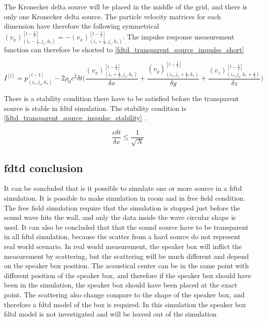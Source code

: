 The Kronecker delta source will be placed in the middle of the grid, and there is only one Kronecker delta source. The particle velocity matrices for each dimension have therefore the following symmetrical $(v_x)_{(i_{s}-\frac{1}{2},j_{s},k_{s})}^{[l-\frac{1}{2}]} = -(v_x)_{(i_{s}+\frac{1}{2},j_{s},k_{s})}^{[l-\frac{1}{2}]}$. The impulse response measurement function can therefore be shorted to \autoref{fdtd_transparent_source_impulse_short}

\begin{equation}\label{fdtd_transparent_source_impulse_short}
I^{[l]}=p_{(i_{s},j_{s},k_{s})}^{[l-1]} - 2\rho_0 c^2 \delta t  \Biggl( \frac{(v_x)_{(i_{s}+\frac{1}{2},j_{s},k_{s})}^{[l-\frac{1}{2}]}}{\delta x} +
 \frac{(v_y)_{(i_{s},j_{s}+\frac{1}{2},k_{s})}^{[l-\frac{1}{2}]}}{\delta y} +  
 \frac{(v_z)_{(i_{s},j_{s},k_{s}+\frac{1}{2})}^{[l-\frac{1}{2}]}}{\delta z} \Biggr)
\end{equation}

There is a stability condition there have to be satisfied before the transparent source is stable in \gls{fdtd} simulation. The stability condition is \autoref{fdtd_transparent_source_impulse_stability} \citep{FDTDtransparent}. 


\begin{equation}\label{fdtd_transparent_source_impulse_stability}
\frac{c \delta t}{\delta x} \leq \frac{1}{\sqrt{N}}
\end{equation}

        \startexplain
    \stopexplain
    
    
\subsection{\gls{fdtd} conclusion}
It can be concluded that is it possible to simulate one or more source in a \gls{fdtd} simulation. It is possible to make simulation in room and in free field condition. The free field simulation require that the simulation is stopped just before the sound wave hits the wall, and only the data inside the wave circular shape is used. It can also be concluded that that the sound source have to be transparent in all \gls{fdtd} simulation, because the scatter from a hard source do not represent real world scenario. In real world measurement, the speaker box will inflict the measurement by scattering, but the scattering will be much different and depend on the speaker box position. The acoustical center can be in the same point with different position of the speaker box, and therefore if the speaker box should have been in the simulation, the speaker box should have been placed at the exact point. The scattering also change compare to the shape of the speaker box, and therefore a \gls{fdtd} model of the box is required. In this simulation the speaker box \gls{fdtd} model is not investigated and will be leaved out of the simulation 


